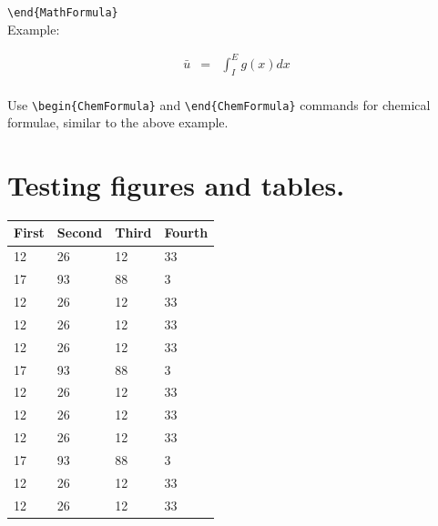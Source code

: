 \documentclass[12pt,Bold,letterpaper,TexShade]{mcgilletdclass}
\numberwithin{equation}{section}
\begin{document}
\begin{BulletList}
\begin{romanList}
{									\verb=\end{MathFormula}=\\
							Example:    \begin{MathFormula}
										\begin{eqnarray}
										\bar u&=& \int_{I}^E g(x)dx \nonumber \\
										\end{eqnarray}
										\end{MathFormula}
						}
			\item{Use \verb=\begin{ChemFormula}= and \verb=\end{ChemFormula}= commands for chemical formulae, similar to the above example.}

			\end{romanList}					 
		
\end{BulletList}

\section{Testing figures and tables.}
\begin{table}[htbp]
  \begin{center}
    \begin{tabular}{llll}
      \hline
      First & Second & Third & Fourth\\
      \hline
      12 & 26 & 12 & 33 \\
      17 & 93 & 88 & 3  \\
      12 & 26 & 12 & 33 \\
      12 & 26 & 12 & 33 \\
      12 & 26 & 12 & 33 \\
      17 & 93 & 88 & 3  \\
      12 & 26 & 12 & 33 \\
      12 & 26 & 12 & 33 \\
      12 & 26 & 12 & 33 \\
      17 & 93 & 88 & 3  \\
      12 & 26 & 12 & 33 \\
      12 & 26 & 12 & 33 \\
      \hline
    \end{tabular}
  \end{center}
\end{table}
\end{document}
